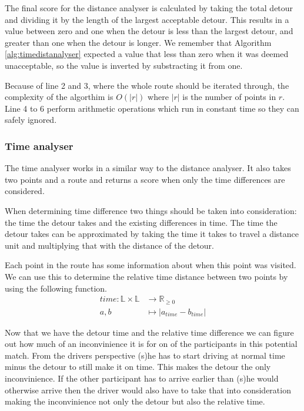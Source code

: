 The final score for the distance analyser is calculated by taking the total detour and dividing it by the length of the largest acceptable detour.
This results in a value between zero and one when the detour is less than the largest detour, and greater than one when the detour is longer.
We remember that Algorithm \ref{alg:timedistanalyser} expected a value that less than zero when it was deemed unacceptable, so the value is inverted by substracting it from one.

Because of line 2 and 3, where the whole route should be iterated through, the complexity of the algorthim is $O(|r|)$ where $|r|$ is the number of points in $r$.
Line 4 to 6 perform arithmetic operations which run in constant time so they can safely ignored.

\subsubsection{Time analyser}

The time analyser works in a similar way to the distance analyser. 
It also takes two points and a route and returns a score when only the time differences are considered.

When determining time difference two things should be taken into consideration: the time the detour takes and the existing differences in time.
The time the detour takes can be approximated by taking the time it takes to travel a distance unit and multiplying that with the distance of the detour.

Each point in the route has some information about when this point was visited.
We can use this to determine the relative time distance between two points by using the following function.
\begin{align*}
	time : \mathbb{L}\times\mathbb{L} &\rightarrow \mathbb{R}_{\geq 0}\\
	a, b &\mapsto | a_{time} - b_{time} |
\end{align*}

Now that we have the detour time and the relative time difference we can figure out how much of an inconvinience it is for on of the participants in this potential match.
From the drivers perspective (s)he has to start driving at normal time minus the detour to still make it on time.
This makes the detour the only inconvinience.
If the other participant has to arrive earlier than (s)he would otherwise arrive then the driver would also have to take that into consideration making the inconvinience not only the detour but also the relative time.

